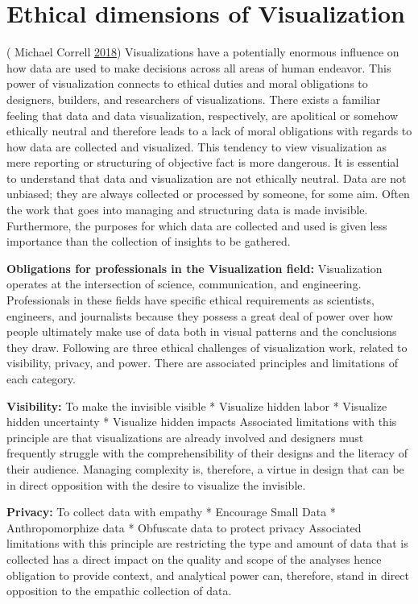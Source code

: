 \documentclass[]{book}
\begin{document}
\hypertarget{ethical-dimensions-of-visualization}{%
\section{Ethical dimensions of Visualization}\label{ethical-dimensions-of-visualization}}

( Michael Correll \protect\hyperlink{ref-ethical_dim}{2018})
Visualizations have a potentially enormous influence on how data are used to make decisions across all areas of human endeavor. This power of visualization connects to ethical duties and moral obligations to designers, builders, and researchers of visualizations.
There exists a familiar feeling that data and data visualization, respectively, are apolitical or somehow ethically neutral and therefore leads to a lack of moral obligations with regards to how data are collected and visualized. This tendency to view visualization as mere reporting or structuring of objective fact is more dangerous. It is essential to understand that data and visualization are not ethically neutral. Data are not unbiased; they are always collected or processed by someone, for some aim. Often the work that goes into managing and structuring data is made invisible. Furthermore, the purposes for which data are collected and used is given less importance than the collection of insights to be gathered.

\textbf{Obligations for professionals in the Visualization field:}
Visualization operates at the intersection of science, communication, and engineering. Professionals in these fields have specific ethical requirements as scientists, engineers, and journalists because they possess a great deal of power over how people ultimately make use of data both in visual patterns and the conclusions they draw. Following are three ethical challenges of visualization work, related to visibility, privacy, and power. There are associated principles and limitations of each category.

\textbf{Visibility:} To make the invisible visible
* Visualize hidden labor
* Visualize hidden uncertainty
* Visualize hidden impacts
Associated limitations with this principle are that visualizations are already involved and designers must frequently struggle with the comprehensibility of their designs and the literacy of their audience. Managing complexity is, therefore, a virtue in design that can be in direct opposition with the desire to visualize the invisible.

\textbf{Privacy:} To collect data with empathy
* Encourage Small Data
* Anthropomorphize data
* Obfuscate data to protect privacy
Associated limitations with this principle are restricting the type and amount of data that is collected has a direct impact on the quality and scope of the analyses hence obligation to provide context, and analytical power can, therefore, stand in direct opposition to the empathic collection of data.
\end{document}

